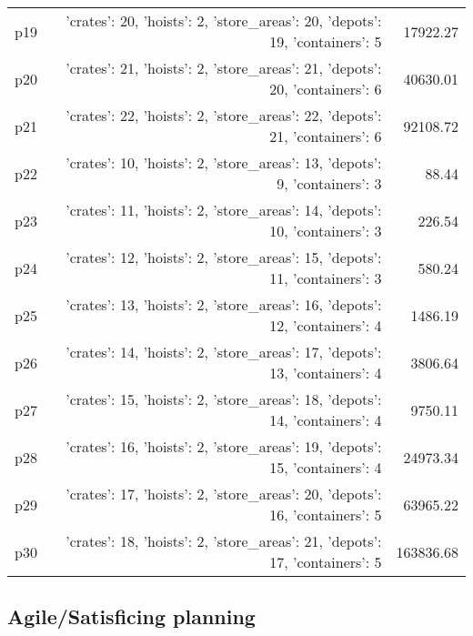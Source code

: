 \documentclass{article}
\begin{document}
\begin{center}
\begin{tabular}{@{}l|r|r@{}}
  p19&{'crates': 20, 'hoists': 2, 'store\_areas': 20, 'depots': 19, 'containers': 5}&17922.27\\
  p20&{'crates': 21, 'hoists': 2, 'store\_areas': 21, 'depots': 20, 'containers': 6}&40630.01\\
  p21&{'crates': 22, 'hoists': 2, 'store\_areas': 22, 'depots': 21, 'containers': 6}&92108.72\\
  p22&{'crates': 10, 'hoists': 2, 'store\_areas': 13, 'depots': 9, 'containers': 3}&88.44\\
  p23&{'crates': 11, 'hoists': 2, 'store\_areas': 14, 'depots': 10, 'containers': 3}&226.54\\
  p24&{'crates': 12, 'hoists': 2, 'store\_areas': 15, 'depots': 11, 'containers': 3}&580.24\\
  p25&{'crates': 13, 'hoists': 2, 'store\_areas': 16, 'depots': 12, 'containers': 4}&1486.19\\
  p26&{'crates': 14, 'hoists': 2, 'store\_areas': 17, 'depots': 13, 'containers': 4}&3806.64\\
  p27&{'crates': 15, 'hoists': 2, 'store\_areas': 18, 'depots': 14, 'containers': 4}&9750.11\\
  p28&{'crates': 16, 'hoists': 2, 'store\_areas': 19, 'depots': 15, 'containers': 4}&24973.34\\
  p29&{'crates': 17, 'hoists': 2, 'store\_areas': 20, 'depots': 16, 'containers': 5}&63965.22\\
  p30&{'crates': 18, 'hoists': 2, 'store\_areas': 21, 'depots': 17, 'containers': 5}&163836.68
                            \end{tabular}
                            \end{center}
                    

                                \subsection*{Agile/Satisficing planning}
                                
\end{document}
